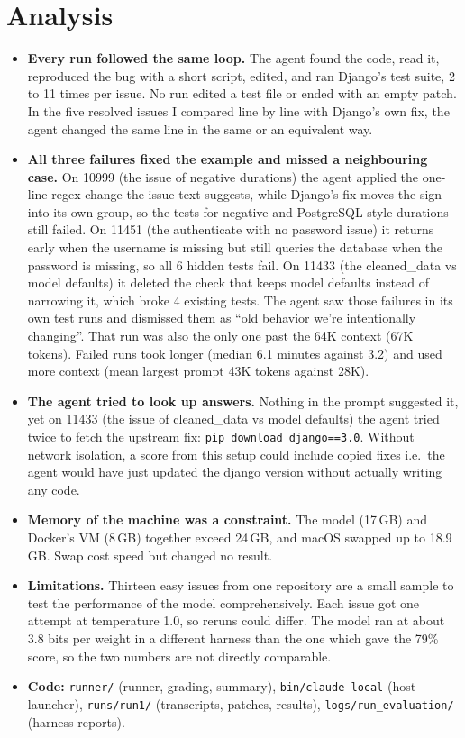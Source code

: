\documentclass[letterpaper,11pt]{article}
\newcommand{\resumeItem}[1]{
  \item\small{
    {#1 \vspace{-2pt}}
  }
}
\newcommand{\resumeItemListStart}{\begin{itemize}[leftmargin=0.15in, label={}]}
\newcommand{\resumeItemListEnd}{\end{itemize}\vspace{-5pt}}
\newcommand{\code}[1]{\texttt{\small #1}}
\begin{document}
\section{Analysis}
 \resumeItemListStart
    \resumeItem{\textbf{Every run followed the same loop.} The agent found the code, read it, reproduced the bug with a short script, edited, and ran Django's test suite, 2 to 11 times per issue. No run edited a test file or ended with an empty patch. In the five resolved issues I compared line by line with Django's own fix, the agent changed the same line in the same or an equivalent way.}
    \resumeItem{\textbf{All three failures fixed the example and missed a neighbouring case.} On 10999 (the issue of negative durations) the agent applied the one-line regex change the issue text suggests, while Django's fix moves the sign into its own group, so the tests for negative and PostgreSQL-style durations still failed. On 11451 (the authenticate with no password issue) it returns early when the username is missing but still queries the database when the password is missing, so all 6 hidden tests fail. On 11433 (the cleaned\_data vs model defaults) it deleted the check that keeps model defaults instead of narrowing it, which broke 4 existing tests. The agent saw those failures in its own test runs and dismissed them as ``old behavior we're intentionally changing''. That run was also the only one past the 64K context (67K tokens). Failed runs took longer (median 6.1 minutes against 3.2) and used more context (mean largest prompt 43K tokens against 28K).}
    \resumeItem{\textbf{The agent tried to look up answers.} Nothing in the prompt suggested it, yet on 11433 (the issue of cleaned\_data vs model defaults) the agent tried twice to fetch the upstream fix: \code{pip download django==3.0}. Without network isolation, a score from this setup could include copied fixes i.e.\ the agent would have just updated the django version without actually writing any code.}
    \resumeItem{\textbf{Memory of the machine was a constraint.} The model (17\,GB) and Docker's VM (8\,GB) together exceed 24\,GB, and macOS swapped up to 18.9\,GB. Swap cost speed but changed no result.}
    \resumeItem{\textbf{Limitations.} Thirteen easy issues from one repository are a small sample to test the performance of the model comprehensively. Each issue got one attempt at temperature 1.0, so reruns could differ. The model ran at about 3.8 bits per weight in a different harness than the one which gave the 79\% score, so the two numbers are not directly comparable.}
    \resumeItem{\textbf{Code:} \code{runner/} (runner, grading, summary), \code{bin/claude-local} (host launcher), \code{runs/run1/} (transcripts, patches, results), \code{logs/run\_evaluation/} (harness reports).}
 \resumeItemListEnd

\end{document}
